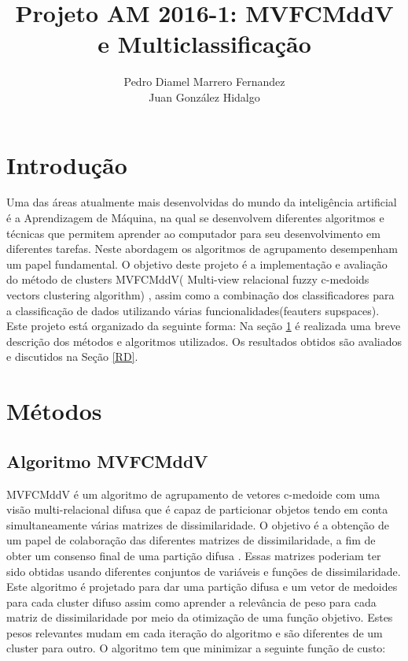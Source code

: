 \documentclass[12pt]{article}
\author{Pedro Diamel Marrero Fernandez \\ Juan González Hidalgo}
\title{Projeto AM 2016-1: MVFCMddV e Multiclassificação}
\begin{document}
\maketitle



\section*{Introdução}

Uma das áreas atualmente mais desenvolvidas do mundo da inteligência artificial é a Aprendizagem de Máquina, na qual se desenvolvem diferentes algoritmos e técnicas que permitem aprender ao computador para seu desenvolvimento em diferentes tarefas. Neste abordagem os algoritmos de agrupamento desempenham um papel fundamental. O objetivo deste projeto é a implementação e avaliação do método de clusters MVFCMddV( Multi-view relacional fuzzy c-medoids vectors clustering algorithm) \cite{de2015multi}, assim como a combinação dos classificadores para a classificação de dados utilizando várias funcionalidades(feauters supspaces). Este projeto está organizado da seguinte forma: Na seção \ref{MET} é realizada uma breve descrição dos métodos e algoritmos utilizados. Os resultados obtidos são avaliados e discutidos na Seção \ref{RD}.

\section{Métodos}\label{MET}

\subsection{Algoritmo MVFCMddV}

MVFCMddV é um algoritmo de agrupamento de vetores c-medoide com uma visão multi-relacional difusa que é capaz de particionar objetos tendo em conta simultaneamente várias matrizes de dissimilaridade. O objetivo é a obtenção de um papel de colaboração das diferentes matrizes de dissimilaridade, a fim de obter um consenso final de uma partição difusa \cite{de2015multi}.
Essas matrizes poderiam ter sido obtidas usando diferentes conjuntos de variáveis e funções de dissimilaridade. Este algoritmo é projetado para dar uma partição difusa e um vetor de medoides para cada cluster difuso assim como aprender a relevância de peso para cada matriz de dissimilaridade por meio da otimização de uma função objetivo. Estes pesos relevantes mudam em cada iteração do algoritmo e são diferentes de um cluster para outro. O algoritmo tem que minimizar a seguinte função de custo:
 
\end{document}
